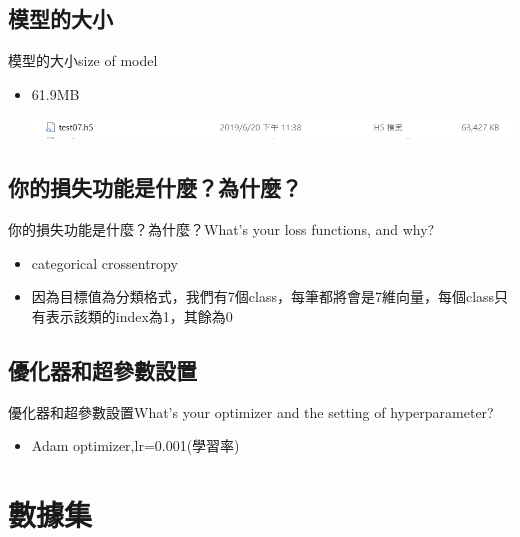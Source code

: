 \documentclass[utf8x]{beamer}
\begin{document}
\subsection{模型的大小}
\begin{frame}{模型的大小}{size of model}
  \begin{itemize}
  \item {
    61.9MB
  }
    \begin{minipage}[c][0.4\textheight][c]{\linewidth}
                \centering
                \includegraphics[width=1.0\linewidth]{1561060727717.jpg}
            \end{minipage}
  \end{itemize}
\end{frame}
\subsection{你的損失功能是什麼？為什麼？}
\begin{frame}{你的損失功能是什麼？為什麼？}{What's your loss functions, and why? }
  \begin{itemize}
  \item {
     categorical crossentropy
  }
\item {
因為目標值為分類格式，我們有7個class，每筆都將會是7維向量，每個class只有表示該類的index為1，其餘為0
  }
  \end{itemize}
\end{frame}
\subsection{優化器和超參數設置}
\begin{frame}{優化器和超參數設置}{What's your optimizer and the setting of hyperparameter?}
  \begin{itemize}
  \item {
      Adam optimizer,lr=0.001(學習率)
  }
  \end{itemize}
\end{frame}
\section{數據集}
\end{document}
